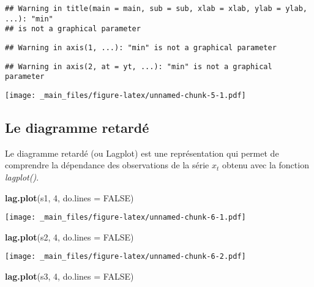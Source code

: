 \documentclass[
]{book}
\newenvironment{Shaded}{\begin{snugshade}}{\end{snugshade}}
\newcommand{\AttributeTok}[1]{\textcolor[rgb]{0.13,0.29,0.53}{#1}}
\newcommand{\ConstantTok}[1]{\textcolor[rgb]{0.56,0.35,0.01}{#1}}
\newcommand{\DecValTok}[1]{\textcolor[rgb]{0.00,0.00,0.81}{#1}}
\newcommand{\FunctionTok}[1]{\textcolor[rgb]{0.13,0.29,0.53}{\textbf{#1}}}
\newcommand{\NormalTok}[1]{#1}
\theoremstyle{definition}
\theoremstyle{definition}
\theoremstyle{definition}
\theoremstyle{definition}
\theoremstyle{remark}
\begin{document}
\begin{verbatim}
## Warning in title(main = main, sub = sub, xlab = xlab, ylab = ylab, ...): "min"
## is not a graphical parameter
\end{verbatim}

\begin{verbatim}
## Warning in axis(1, ...): "min" is not a graphical parameter
\end{verbatim}

\begin{verbatim}
## Warning in axis(2, at = yt, ...): "min" is not a graphical parameter
\end{verbatim}

\texttt{[image: \_main\_files/figure-latex/unnamed-chunk-5-1.pdf]}

\hypertarget{le-diagramme-retarduxe9}{%
\subsection{Le diagramme retardé}\label{le-diagramme-retarduxe9}}

Le diagramme retardé (ou Lagplot) est une représentation qui permet de comprendre la dépendance des observations de la série \(x_t\) obtenu avec la fonction \emph{lagplot()}.

\begin{Shaded}
\begin{Highlighting}[]
\FunctionTok{lag.plot}\NormalTok{(s1, }\DecValTok{4}\NormalTok{, }\AttributeTok{do.lines =} \ConstantTok{FALSE}\NormalTok{)}
\end{Highlighting}
\end{Shaded}

\texttt{[image: \_main\_files/figure-latex/unnamed-chunk-6-1.pdf]}

\begin{Shaded}
\begin{Highlighting}[]
\FunctionTok{lag.plot}\NormalTok{(s2, }\DecValTok{4}\NormalTok{, }\AttributeTok{do.lines =} \ConstantTok{FALSE}\NormalTok{)}
\end{Highlighting}
\end{Shaded}

\texttt{[image: \_main\_files/figure-latex/unnamed-chunk-6-2.pdf]}

\begin{Shaded}
\begin{Highlighting}[]
\FunctionTok{lag.plot}\NormalTok{(s3, }\DecValTok{4}\NormalTok{, }\AttributeTok{do.lines =} \ConstantTok{FALSE}\NormalTok{)}
\end{Highlighting}
\end{Shaded}
\end{document}

